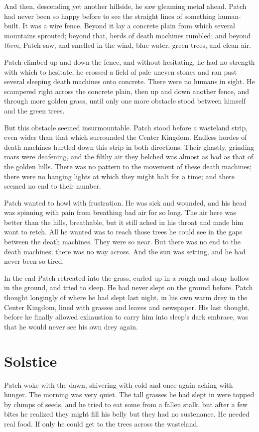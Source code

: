 \documentclass[ebook,oneside,openany,17pt]{memoir}
\renewcommand{\thechapter}{\Roman{chapter}}
\newcounter{sections}
\newcommand{\sections}[1]{%
  \section*{#1}
  \addtocounter{sections}{1}%
  \pdfbookmark[1]{#1}{section.\thechapter.\thesections}}
\begin{document}
And then, descending yet another hillside, he saw gleaming metal
ahead. Patch had never been so happy before to see the straight lines
of something human-built. It was a wire fence. Beyond it lay a
concrete plain from which several mountains sprouted; beyond that,
herds of death machines rumbled; and beyond \emph{them,} Patch saw,
and smelled in the wind, blue water, green trees, and clean air.

Patch climbed up and down the fence, and without hesitating, he had no
strength with which to hesitate, he crossed a field of pale uneven
stones and ran past several sleeping death machines onto
concrete. There were no humans in sight. He scampered right across the
concrete plain, then up and down another fence, and through more
golden grass, until only one more obstacle stood between himself and
the green trees.

But this obstacle seemed insurmountable. Patch stood before a
wasteland strip, even wider than that which surrounded the Center
Kingdom. Endless hordes of death machines hurtled down this strip in
both directions. Their ghastly, grinding roars were deafening, and the
filthy air they belched was almost as bad as that of the golden
hills. There was no pattern to the movement of these death machines;
there were no hanging lights at which they might halt for a time; and
there seemed no end to their number.

Patch wanted to howl with frustration. He was sick and wounded, and
his head was spinning with pain from breathing bad air for so
long. The air here was better than the hills, breathable, but it still
ached in his throat and made him want to retch. All he wanted was to
reach those trees he could see in the gaps between the death
machines. They were so near. But there was no end to the death
machines; there was no way across. And the sun was setting, and he had
never been so tired.

In the end Patch retreated into the grass, curled up in a rough and
stony hollow in the ground, and tried to sleep. He had never slept on
the ground before. Patch thought longingly of where he had slept last
night, in his own warm drey in the Center Kingdom, lined with grasses
and leaves and newspaper. His last thought, before he finally allowed
exhaustion to carry him into sleep’s dark embrace, was that he would
never see his own drey again.


\sections{Solstice}

Patch woke with the dawn, shivering with cold and once again aching
with hunger. The morning was very quiet. The tall grasses he had slept
in were topped by clumps of seeds, and he tried to eat some from a
fallen stalk, but after a few bites he realized they might fill his
belly but they had no sustenance. He needed real food. If only he
could get to the trees across the wasteland.
\end{document}

